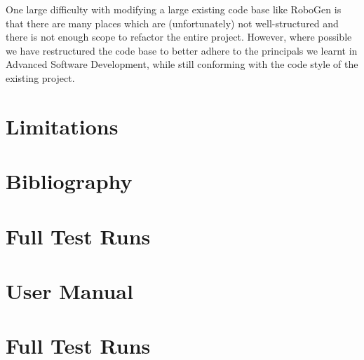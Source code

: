 \documentclass[11pt,a4paper]{article}
\begin{document}
One large difficulty with modifying a large existing code base like RoboGen is
that there are many places which are (unfortunately) not well-structured and
there is not enough scope to refactor the entire project. However, where
possible we have restructured the code base to better adhere to the principals
we learnt in Advanced Software Development, while still conforming with the
code style of the existing project.

\section{Limitations}

\section{Bibliography}
\printbibliography

\appendix

\section{Full Test Runs}
\label{s:full-test-runs}


\section{User Manual}
\label{s:user-manual}

\section{Full Test Runs}
\label{s:full-test-runs}

\end{document}

